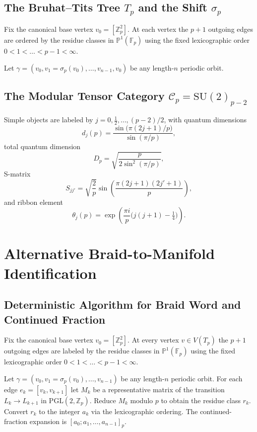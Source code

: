 \documentclass[11pt,a4paper]{amsart}
\begin{document}
\subsection{The Bruhat--Tits Tree \(T_p\) and the Shift \(\sigma_p\)}
Fix the canonical base vertex \(v_0 = [\mathbb{Z}_p^2]\). At each vertex the \(p+1\) outgoing edges are ordered by the residue classes in \(\mathbb{P}^1(\mathbb{F}_p)\) using the fixed lexicographic order \(0 < 1 < \dots < p-1 < \infty\).

Let \(\gamma = (v_0, v_1 = \sigma_p(v_0), \dots, v_{n-1}, v_0)\) be any length-\(n\) periodic orbit.

\subsection{The Modular Tensor Category \(\mathcal{C}_p = \mathrm{SU}(2)_{p-2}\)}
Simple objects are labeled by \(j = 0, \frac12, \dots, (p-2)/2\), with quantum dimensions
\[
d_j(p) = \frac{\sin\bigl(\pi(2j+1)/p\bigr)}{\sin(\pi/p)},
\]
total quantum dimension
\[
D_p = \sqrt{\frac{p}{2\sin^2(\pi/p)}},
\]
S-matrix
\[
S_{jj'} = \sqrt{\frac{2}{p}} \sin\left( \frac{\pi(2j+1)(2j'+1)}{p} \right),
\]
and ribbon element
\[
\theta_j(p) = \exp\left( \frac{\pi i}{p} \bigl( j(j+1) - \tfrac14 \bigr) \right).
\]

\section{Alternative Braid-to-Manifold Identification}

\subsection{Deterministic Algorithm for Braid Word and Continued Fraction}
Fix the canonical base vertex \(v_0 = [\mathbb{Z}_p^2]\). At every vertex \(v \in V(T_p)\) the \(p+1\) outgoing edges are labeled by the residue classes in \(\mathbb{P}^1(\mathbb{F}_p)\) using the fixed lexicographic order \(0 < 1 < \dots < p-1 < \infty\).

Let \(\gamma = (v_0, v_1 = \sigma_p(v_0), \dots, v_{n-1})\) be any length-\(n\) periodic orbit. For each edge \(e_k = [v_k, v_{k+1}]\) let \(M_k\) be a representative matrix of the transition \(L_k \to L_{k+1}\) in \(\mathrm{PGL}(2,\mathbb{Z}_p)\). Reduce \(M_k\) modulo \(p\) to obtain the residue class \(r_k\). Convert \(r_k\) to the integer \(a_k\) via the lexicographic ordering. The continued-fraction expansion is \([a_0; a_1, \dots, a_{n-1}]_p\).
\end{document}

